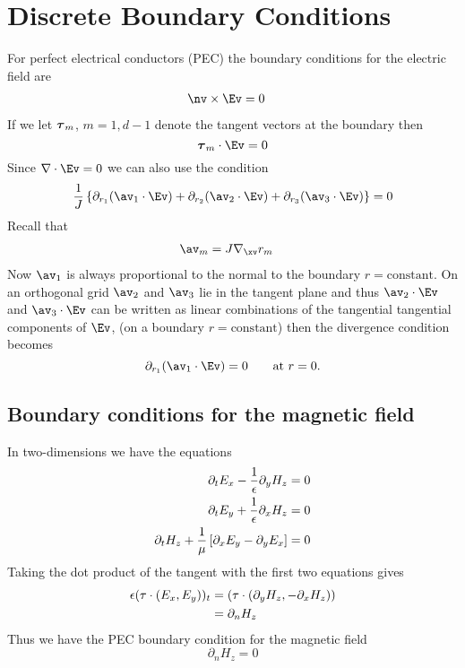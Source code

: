 \documentclass[10pt]{article}
\newcommand{\grad}{\nabla}
\begin{document}
\section{Discrete Boundary Conditions}

\newcommand{\pra}{\partial_{r_1}}
\newcommand{\prb}{\partial_{r_2}}
\newcommand{\prc}{\partial_{r_3}}

For perfect electrical conductors (PEC) the boundary conditions for the electric field are
\begin{align}
  \nv\times\Ev & = 0
\end{align}
If we let $\boldsymbol{\tau}_m$, $m=1,d-1$ denote the tangent vectors at the boundary then
\[
  \tauv_m\cdot\Ev=0
\]
Since $\grad\cdot\Ev=0$ we can also use the condition
\[
  {1\over J}\left\{ \pra( \av_1\cdot\Ev) + \prb( \av_2\cdot\Ev) + \prc( \av_3\cdot\Ev) \right\} =0
\]
Recall that
\begin{align*}
   \av_m &= J \grad_{\xv} r_m
\end{align*}
Now $\av_1$ is always proportional to the normal to the boundary $r=\mbox{constant}$. 
On an orthogonal grid $\av_2$ and $\av_3$ lie in the tangent plane and thus
$\av_2\cdot\Ev$ and $\av_3\cdot\Ev$ can be written as linear combinations of the
tangential tangential components of $\Ev$, (on a boundary $r=\mbox{constant}$) then
the divergence condition becomes
\[
  \pra( \av_1\cdot\Ev ) =0 \qquad \mbox{at $r=0$}.
\]

\subsection{Boundary conditions for the magnetic field}

In two-dimensions we have the equations
\begin{align*}
\partial_t E_x - {1\over \epsilon} \partial_y H_z &=0 \\
\partial_t E_y + {1\over \epsilon} \partial_x H_z &=0 \\
\partial_t H_z + {1\over \mu } \left[ \partial_x E_y - \partial_y E_x \right] &=0 
\end{align*}
Taking the dot product of the tangent with the first two equations gives
\begin{align*}
  \epsilon (\tau\cdot(E_x,E_y))_t & = ( \tau\cdot(\partial_y H_z,-\partial_x H_z) ) \\
                              & = \partial_n H_z
\end{align*}
Thus we have the PEC boundary condition for the magnetic field
\[
   \partial_n H_z = 0 
\]
\end{document}
